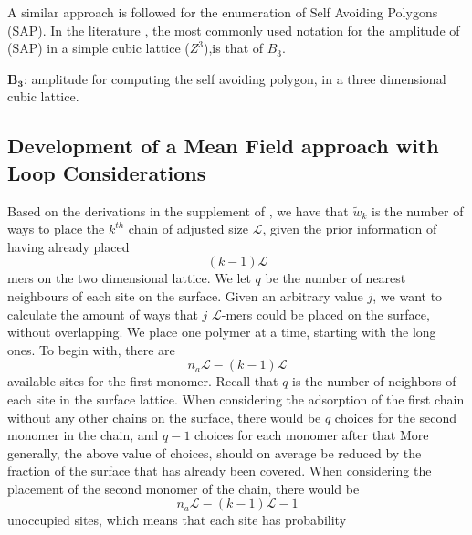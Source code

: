 \documentclass[12pt,letterpaper]{article}
\newcommand{\leng}{\mathcal{L}}
\begin{document}
\begin{tcolorbox}
A similar approach \cite{guttmann2009polygons} is followed for the enumeration of Self Avoiding Polygons (SAP). In the literature \cite{guttmann2009polygons}, the most commonly used notation for the amplitude of (SAP) in a simple cubic lattice ($Z^3$),is that of $B_3$.
\end{tcolorbox}

$\boldsymbol{B_3}$: amplitude for computing the self avoiding polygon, in a three dimensional cubic lattice.

\subsection{Development of a Mean Field approach with Loop Considerations}

Based on the derivations in the supplement of  \cite{koumarianos2021theory}, we have that $\tilde{w}_k$ is the number of ways to place the $k^{th}$ chain of adjusted size $\leng$, given the prior information of having already placed
%
$$
(k-1)\leng
$$
%
mers on the two dimensional lattice. We let $q$ be the number of nearest neighbours of each site on the surface. 
%
%
%
Given an arbitrary value $j$, we want to calculate the amount of ways that $j$ $\leng$-mers could be placed on the surface, without overlapping.
%
We place one polymer at a time, starting with the long ones.
%
%
To begin with, there are
$$
n_a\leng-(k-1)\leng
$$
available sites for the first monomer. 
%
Recall that  $q$ is the number of neighbors of each site in the surface lattice.
%
When considering the adsorption of the first chain without any other chains on the surface, there would be $q$ choices for the second monomer in the chain,
and $q-1$ choices for each monomer after that 
%
%
More generally, the above value of choices, should on average be reduced by the fraction of the surface that has already been covered.
%
When considering the placement of the second monomer of the chain, there would be
$$
n_a\leng-(k-1)\leng-1
$$
unoccupied sites, which means that each site has probability 
\end{document}
